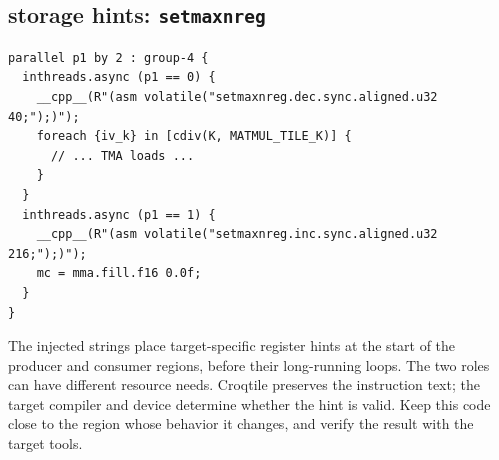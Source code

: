 \subsection*{storage hints: \texttt{setmaxnreg}}

\begin{lstlisting}[language=croqtile,caption={storage hints: setmaxnreg}]
parallel p1 by 2 : group-4 {
  inthreads.async (p1 == 0) {
    __cpp__(R"(asm volatile("setmaxnreg.dec.sync.aligned.u32 40;");)");
    foreach {iv_k} in [cdiv(K, MATMUL_TILE_K)] {
      // ... TMA loads ...
    }
  }
  inthreads.async (p1 == 1) {
    __cpp__(R"(asm volatile("setmaxnreg.inc.sync.aligned.u32 216;");)");
    mc = mma.fill.f16 0.0f;
  }
}
\end{lstlisting}

The injected strings place target-specific register hints at the start of the producer and consumer regions, before their long-running loops. The two roles can have different resource needs. Croqtile preserves the instruction text; the target compiler and device determine whether the hint is valid. Keep this code close to the region whose behavior it changes, and verify the result with the target tools.
